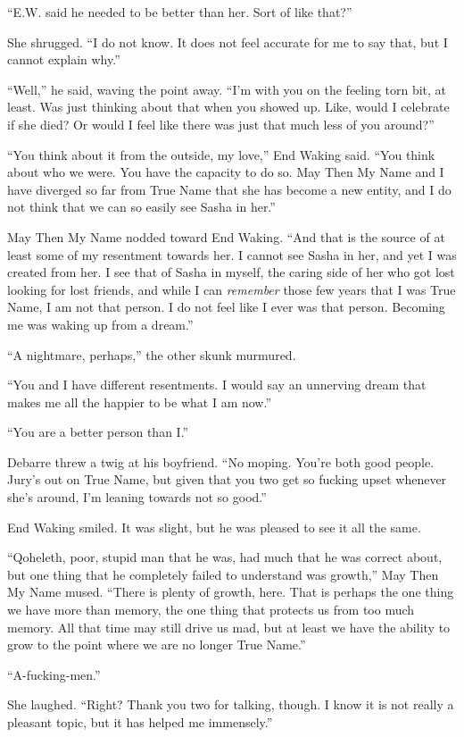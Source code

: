 ``E.W. said he needed to be better than her. Sort of like that?''

She shrugged. ``I do not know. It does not feel accurate for me to say that, but I cannot explain why.''

``Well,'' he said, waving the point away. ``I'm with you on the feeling torn bit, at least. Was just thinking about that when you showed up. Like, would I celebrate if she died? Or would I feel like there was just that much less of you around?''

``You think about it from the outside, my love,'' End Waking said. ``You think about who we were. You have the capacity to do so. May Then My Name and I have diverged so far from True Name that she has become a new entity, and I do not think that we can so easily see Sasha in her.''

May Then My Name nodded toward End Waking. ``And that is the source of at least some of my resentment towards her. I cannot see Sasha in her, and yet I was created from her. I see that of Sasha in myself, the caring side of her who got lost looking for lost friends, and while I can \emph{remember} those few years that I was True Name, I am not that person. I do not feel like I ever was that person. Becoming me was waking up from a dream.''

``A nightmare, perhaps,'' the other skunk murmured.

``You and I have different resentments. I would say an unnerving dream that makes me all the happier to be what I am now.''

``You are a better person than I.''

Debarre threw a twig at his boyfriend. ``No moping. You're both good people. Jury's out on True Name, but given that you two get so fucking upset whenever she's around, I'm leaning towards not so good.''

End Waking smiled. It was slight, but he was pleased to see it all the same.

``Qoheleth, poor, stupid man that he was, had much that he was correct about, but one thing that he completely failed to understand was growth,'' May Then My Name mused. ``There is plenty of growth, here. That is perhaps the one thing we have more than memory, the one thing that protects us from too much memory. All that time may still drive us mad, but at least we have the ability to grow to the point where we are no longer True Name.''

``A-fucking-men.''

She laughed. ``Right? Thank you two for talking, though. I know it is not really a pleasant topic, but it has helped me immensely.''

